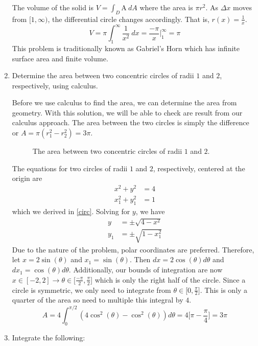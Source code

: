 \begin{enumerate}
  The volume of the solid is \(V = \int_D\text{A} \ dA\) where the area is
  \(\pi r^2\).
  As \(\Delta x\) moves from \([1, \infty)\), the differential circle changes
  accordingly.
  That is, \(r(x) = \frac{1}{x}\).
  \[
  V = \pi\int_1^{\infty}\frac{1}{x^2} \ dx = \frac{-\pi}{x}\bigg|_1^{\infty}
  = \pi
  \]
  This problem is traditionally known as Gabriel's Horn which has infinite
  surface area and finite volume.
\item
  Determine the area between two concentric circles of radii \(1\) and \(2\),
  respectively, using calculus.
  \par\smallskip
  Before we use calculus to find the area, we can determine the area from
  geometry.
  With this solution, we will be able to check are result from our calculus
  approach.
  The area between the two circles is simply the difference or
  \(A = \pi(r_1^2 - r_2^2) = 3\pi\).
  \begin{figure}[H]
    \centering
    
    \caption{The area between two concentric circles of radii \(1\) and \(2\).}
  \end{figure}
  The equations for two circles of radii \(1\) and \(2\), respectively, centered
  at the origin are
  \begin{align*}
    x^2 + y^2 & = 4\\
    x_1^2 + y_1^2 &= 1
  \end{align*}
  which we derived in \cref{circ}.
  Solving for \(y\), we have
  \begin{align*}
    y &= \pm\sqrt{4 - x^2}\\
    y_1 &= \pm\sqrt{1 - x_1^2}
  \end{align*}
  Due to the nature of the problem, polar coordinates are preferred.
  Therefore, let \(x = 2\sin(\theta)\) and \(x_1 = \sin(\theta)\).
  Then \(dx = 2\cos(\theta)d\theta\) and \(dx_1 = \cos(\theta)d\theta\).
  Additionally, our bounds of integration are now
  \(x\in[-2, 2]\to\theta\in\big[\frac{-\pi}{2}, \frac{\pi}{2}\big]\) which is
  only the right half of the circle.
  Since a circle is symmetric, we only need to integrate from
  \(\theta\in\big[0, \frac{\pi}{2}\big]\).
  This is only a quarter of the area so need to multiple this integral by \(4\).
  \[
  A = 4\int_0^{\pi/2}(4\cos^2(\theta) - \cos^2(\theta))d\theta =
  4\bigg[\pi - \frac{\pi}{4}\bigg] = 3\pi
  \]
\item
  Integrate the following:
  \begin{enumerate}[label = (\alph*), ref = \theenumi{(\alph*)}]

\end{enumerate}
\end{enumerate}
